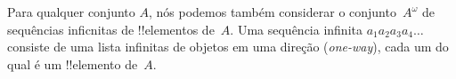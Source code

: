 \documentclass[../../../include/open-logic-section]{subfiles}
\begin{document}

\begin{ex}
Para qualquer conjunto $A$, nós podemos também considerar o conjunto~$A^\omega$
de sequências inficnitas de !!{elemento}s de~$A$. Uma sequência infinita 
$a_1a_2a_3a_4\dots$ consiste de uma lista infinitas de objetos em uma direção
(\emph{one-way}), cada um do qual é um !!{elemento} de~$A$.
\end{ex}

\end{document}
